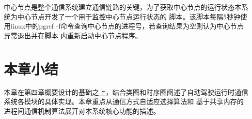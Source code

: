 中心节点是整个通信系统建立通信链路的关键，为了获取中心节点的运行状态本系统为中心节点开发了一个用于监控中心节点运行状态的
脚本。该脚本每隔5秒钟使用linux中的pgref -f命令查询中心节点的进程号，若查询结果为空则认为中心节点异常退出并在脚本
内重新启动中心节点程序。

\section{本章小结}
本章在第四章概要设计的基础之上，结合类图和时序图阐述了自动驾驶运行时通信系统各模块的具体实现。本章重点从通信方式自适应选择算法和
基于共享内存的进程间通信机制算法展开对本系统核心功能的描述。

